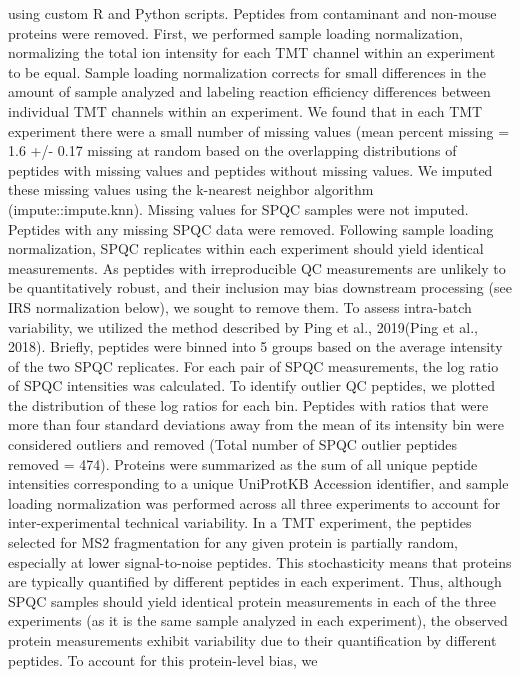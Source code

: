using custom R and Python scripts. Peptides from contaminant and non-mouse
proteins were removed. First, we performed sample loading normalization,
normalizing the total ion intensity for each TMT channel within an experiment to
be equal. Sample loading normalization corrects for small differences in the
amount of sample analyzed and labeling reaction efficiency differences between
individual TMT channels within an experiment. 
We found that in each TMT experiment there were a small number of missing values
(mean percent missing = 1.6 +/- 0.17%
missing at random based on the overlapping distributions of peptides with
missing values and peptides without missing values. We imputed these missing
values using the k-nearest neighbor algorithm (impute::impute.knn). Missing
values for SPQC samples were not imputed. Peptides with any missing SPQC data
were removed. 
Following sample loading normalization, SPQC replicates within each experiment
should yield identical measurements. As peptides with irreproducible QC
measurements are unlikely to be quantitatively robust, and their inclusion may
bias downstream processing (see IRS normalization below), we sought to remove
them. To assess intra-batch variability, we utilized the method described by
Ping et al., 2019(Ping et al., 2018). Briefly, peptides were binned into 5
groups based on the average intensity of the two SPQC replicates. For each pair
of SPQC measurements, the log ratio of SPQC intensities was calculated. To
identify outlier QC peptides, we plotted the distribution of these log ratios
for each bin. Peptides with ratios that were more than four standard deviations
away from the mean of its intensity bin were considered outliers and removed
(Total number of SPQC outlier peptides removed = 474). 
Proteins were summarized as the sum of all unique peptide intensities
corresponding to a unique UniProtKB Accession identifier, and sample loading
normalization was performed across all three experiments to account for
inter-experimental technical variability. In a TMT experiment, the peptides
selected for MS2 fragmentation for any given protein is partially random,
especially at lower signal-to-noise peptides. This stochasticity means that
proteins are typically quantified by different peptides in each experiment.
Thus, although SPQC samples should yield identical protein measurements in each
of the three experiments (as it is the same sample analyzed in each experiment),
the observed protein measurements exhibit variability due to their
quantification by different peptides. To account for this protein-level bias, we
